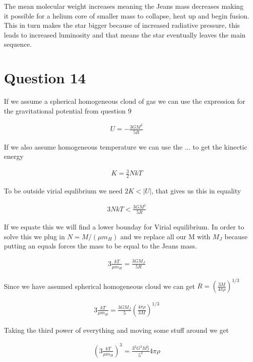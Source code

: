 \documentclass[a4paper]{article}
\begin{document}
The mean molecular weight increases meaning the Jeans mass decreases making it possible for a helium core of smaller mass to collapse, heat up and begin fusion. This in turn makes the star bigger because of increased radiative pressure, this leads to increased luminosity and that means the star eventually leaves the main sequence. 

\section*{Question 14}

If we assume a spherical homogeneous cloud of gas we can use the expression for the gravitational potential from question 9

\begin{align}
    U = -\frac{3GM^2}{5R}
\end{align}

If we also assume homogeneous temperature we can use the ... to get the kinectic energy

\begin{align}
    K = \frac{3}{2} N k T
\end{align}

To be outside virial equlibrium we need $2K < |U|$, that gives us this in equality

\begin{align}
    3 N k T < \frac{3GM^2}{5R}
\end{align}

If we equate this we will find a lower bounday for Virial equilibrium. In order to solve this we plug in $N = M/(\mu m_H)$ and we replace all our M with $M_J$ because putting an equals forces the mass to be equal to the Jeans mass. 

\begin{align}
    3 \frac{kT}{\mu m_H} = \frac{3GM_J}{5R}
\end{align}

Since we have assumed spherical homogeneous cloud we can get $R = \left ( \frac{3M}{4\pi \rho } \right ) ^{1/3}$

\begin{align}
    3 \frac{kT}{\mu m_H} = \frac{3GM_J}{5} \left ( \frac{4\pi \rho }{3M} \right ) ^{1/3}
\end{align}

Taking the third power of everything and moving some stuff around we get

\begin{align}
    \left ( 3 \frac{kT}{\mu m_H} \right )^3 =  \frac{3^2 G^3 M_J^2}{5^3}4 \pi \rho
\end{align}
\end{document}
